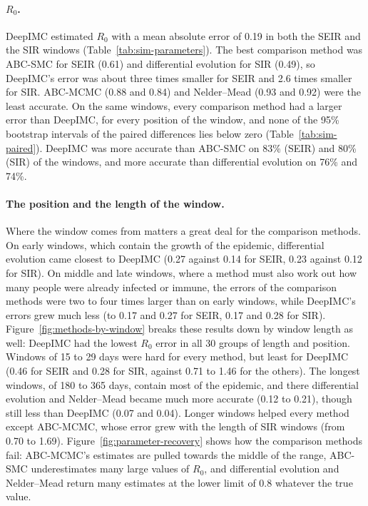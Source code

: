 \documentclass[12pt]{article}
\begin{document}
\paragraph{$R_0$.} DeepIMC estimated $R_0$ with a mean absolute error of 0.19 in both the SEIR and the SIR
windows (Table~\ref{tab:sim-parameters}). The best comparison method was ABC-SMC for SEIR (0.61) and
differential evolution for SIR (0.49), so DeepIMC's error was about three times smaller for SEIR and 2.6 times
smaller for SIR. ABC-MCMC (0.88 and 0.84) and Nelder--Mead (0.93 and 0.92) were the least accurate. On the same
windows, every comparison method had a larger error than DeepIMC, for every position of the window, and none of
the 95\% bootstrap intervals of the paired differences lies below zero (Table~\ref{tab:sim-paired}). DeepIMC
was more accurate than ABC-SMC on 83\% (SEIR) and 80\% (SIR) of the windows, and more accurate than
differential evolution on 76\% and 74\%.

\paragraph{The position and the length of the window.} Where the window comes from matters a great deal for the
comparison methods. On early windows, which contain the growth of the epidemic, differential evolution came
closest to DeepIMC (0.27 against 0.14 for SEIR, 0.23 against 0.12 for SIR). On middle and late windows, where a
method must also work out how many people were already infected or immune, the errors of the comparison methods
were two to four times larger than on early windows, while DeepIMC's errors grew much less (to 0.17 and 0.27 for
SEIR, 0.17 and 0.28 for SIR). Figure~\ref{fig:methods-by-window} breaks these results down by window length as
well: DeepIMC had the lowest $R_0$ error in all 30 groups of length and position. Windows of 15 to 29 days were
hard for every method, but least for DeepIMC (0.46 for SEIR and 0.28 for SIR, against 0.71 to 1.46 for the
others). The longest windows, of 180 to 365 days, contain most of the epidemic, and there differential evolution
and Nelder--Mead became much more accurate (0.12 to 0.21), though still less than DeepIMC (0.07 and 0.04). Longer
windows helped every method except ABC-MCMC, whose error grew with the length of SIR windows (from 0.70 to 1.69).
Figure~\ref{fig:parameter-recovery} shows how the comparison methods fail: ABC-MCMC's estimates are pulled
towards the middle of the range, ABC-SMC underestimates many large values of $R_0$, and differential evolution
and Nelder--Mead return many estimates at the lower limit of 0.8 whatever the true value.
\end{document}
